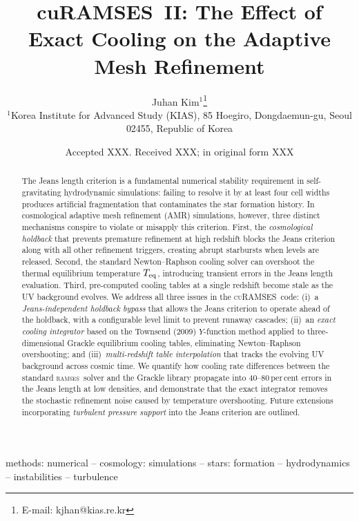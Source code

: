 \documentclass[fleqn,usenatbib]{mnras}
\title[cuRAMSES~II: The Effect of Exact Cooling on the Adaptive Mesh Refinement]
{cuRAMSES~II: The Effect of Exact Cooling on the Adaptive Mesh Refinement}
\author[J. Kim]{Juhan Kim$^{1}$\thanks{E-mail: kjhan@kias.re.kr}
\\
$^{1}$Korea Institute for Advanced Study (KIAS),
85 Hoegiro, Dongdaemun-gu, Seoul 02455, Republic of Korea}
\date{Accepted XXX. Received XXX; in original form XXX}
\newcommand{\ramses}{\textsc{ramses}}
\newcommand{\curamses}{\textsc{cuRAMSES}}
\begin{document}
\label{firstpage}
\pagerange{\pageref{firstpage}--\pageref{lastpage}}
\maketitle

\begin{abstract}
The Jeans length criterion is a fundamental numerical stability
requirement in self-gravitating hydrodynamic simulations: failing to
resolve it by at least four cell widths produces artificial
fragmentation that contaminates the star formation history.  In
cosmological adaptive mesh refinement (AMR) simulations, however,
three distinct mechanisms conspire to violate or misapply this
criterion.  First, the \emph{cosmological holdback} that prevents
premature refinement at high redshift blocks the Jeans criterion
along with all other refinement triggers, creating abrupt starbursts
when levels are released.  Second, the standard Newton--Raphson
cooling solver can overshoot the thermal equilibrium temperature
$T_{\rm eq}$, introducing transient errors in the Jeans length
evaluation.  Third, pre-computed cooling tables at a single redshift
become stale as the UV background evolves.  We address all three
issues in the \curamses\ code: (i)~a \emph{Jeans-independent
holdback bypass} that allows the Jeans criterion to operate ahead of
the holdback, with a configurable level limit to prevent runaway
cascades; (ii)~an \emph{exact cooling integrator} based on the
Townsend (2009) $Y$-function method applied to three-dimensional
Grackle equilibrium cooling tables, eliminating Newton--Raphson
overshooting; and (iii)~\emph{multi-redshift table interpolation}
that tracks the evolving UV background across cosmic time.  We
quantify how cooling rate differences between the standard
\ramses\ solver and the Grackle library propagate into
40--80\,per\,cent errors in the Jeans length at low densities,
and demonstrate that the exact integrator removes the stochastic
refinement noise caused by temperature overshooting.  Future
extensions incorporating \emph{turbulent pressure support} into the
Jeans criterion are outlined.
\end{abstract}

\begin{keywords}
methods: numerical -- cosmology: simulations --
stars: formation -- hydrodynamics -- instabilities --
turbulence
\end{keywords}


\end{document}
